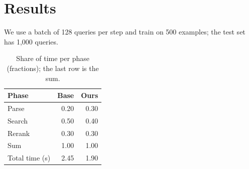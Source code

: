 \documentclass{article}\usepackage{booktabs}
\begin{document}
\section{Results}
We use a batch of 128 queries per step and train on 500 examples; the test set has 1,000 queries.
\begin{table}[h]\centering\caption{Share of time per phase (fractions); the last row is the sum.}\label{tab:a}
\begin{tabular}{lrr}
\toprule
Phase & Base & Ours \\
\midrule
Parse & 0.20 & 0.30 \\
Search & 0.50 & 0.40 \\
Rerank & 0.30 & 0.30 \\
Sum & 1.00 & 1.00 \\
Total time (s) & 2.45 & 1.90 \\
\bottomrule
\end{tabular}\end{table}
\end{document}
